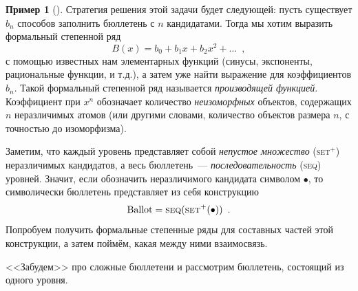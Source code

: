 \documentclass[a5paper]{article}
\theoremstyle{definition}
\newtheorem{example}{Пример}
\begin{document}
\begin{example}[{\cite[Example 10, p.36]{species}}]
Стратегия решения этой задачи будет следующей: пусть существует \( b_n \) 
способов заполнить бюллетень с \( n \) кандидатами. Тогда мы хотим выразить 
формальный степенной ряд
\[
	B(x) = b_0 + b_1 x + b_2 x^2 + \ldots \enspace ,
\]
с помощью известных нам элементарных функций (синусы, экспоненты, рациональные 
функции, и т.д.), а затем уже найти выражение для коэффициентов \( b_n \). 
Такой формальный степенной ряд называется \textit{производящей функцией}. 
Коэффициент при \( x^n \) обозначает количество \textit{неизоморфных} объектов, 
содержащих \( n \) неразличимых
атомов (или другими словами, количество объектов размера \( n \), с точностью 
до изоморфизма).

Заметим, что каждый уровень представляет собой \textit{непустое множество} 
(\textsc{set}\( ^{+} \)) неразличимых кандидатов, а весь бюллетень~--- 
\textit{последовательность} (\textsc{seq}) уровней. Значит, если обозначить 
неразличимого кандидата символом \( \bullet \), то символически бюллетень 
представляет из себя конструкцию
\[
	\mathrm{Ballot} = \text{\textsc{seq}(\textsc{set$^{+}$}($\bullet$))}
	\enspace .
\]
Попробуем получить формальные степенные ряды для составных частей этой 
конструкции, а затем поймём, какая между ними взаимосвязь.

<<Забудем>> про сложные бюллетени и рассмотрим бюллетень, состоящий из одного 
уровня.


\end{example}
\end{document}
